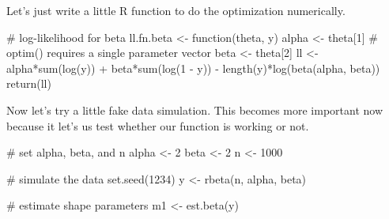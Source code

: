 \documentclass[handout]{beamer}
\begin{document}
\begin{frame}[fragile]
Let's just write a little R function to do the optimization numerically.
\begin{scriptsize}
\pause \begin{blockcode} 
# log-likelihood for beta
ll.fn.beta <- function(theta, y) {
  alpha <- theta[1]  # optim() requires a single parameter vector
  beta <- theta[2]
  ll <- alpha*sum(log(y)) + beta*sum(log(1 - y)) - 
           length(y)*log(beta(alpha, beta))
  return(ll)
}
\end{blockcode}

\pause {}
\end{scriptsize}
\end{frame}

\begin{frame}[fragile]
Now let's try a little fake data simulation. This becomes more important now because it let's us test whether our function is working or not.
\pause \begin{blockcode}
# set alpha, beta, and n
alpha <- 2
beta <- 2
n <- 1000
\end{blockcode}

\pause \begin{blockcode}
# simulate the data
set.seed(1234)
y <- rbeta(n, alpha, beta)
\end{blockcode}

\pause \begin{blockcode}
# estimate shape parameters
m1 <- est.beta(y)
\end{blockcode}
\end{frame}

\begin{frame}[fragile]
\end{frame}
\end{document}
